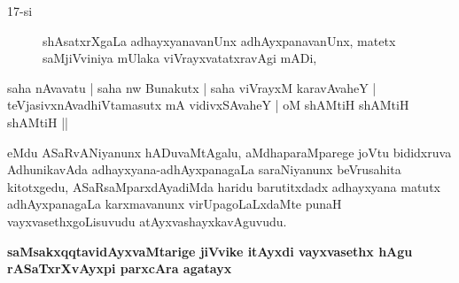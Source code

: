 \begin{description}
\item[17-si] shAsatxrXgaLa adhayxyanavanUnx adhAyxpanavanUnx, matetx saMjiVviniya mUlaka viVrayxvatatxravAgi mADi,
\end{description}
\begin{shloka}
saha nAvavatu | saha nw Bunakutx | saha viVrayxM karavAvaheY |\\\label{46}
teVjasivxnAvadhiVtamasutx mA vidivxSAvaheY | oM shAMtiH shAMtiH shAMtiH ||
\end{shloka}
\smallskip

\noindent
eMdu ASaRvANiyanunx hADuvaMtAgalu, aMdhaparaMparege joVtu bididxruva AdhunikavAda adhayxyana-adhAyxpanagaLa saraNiyanunx beVrusahita kitotxgedu, ASaRsaMparxdAyadiMda haridu barutitxdadx adhayxyana matutx adhAyxpanagaLa karxmavanunx virUpagoLaLxdaMte punaH vayxvasethxgoLisuvudu atAyxvashayxkavAguvudu.

{\bigskip
\noindent
{\large\bf saMsakxqqtavidAyxvaMtarige jiVvike itAyxdi vayxvasethx hAgu rASaTxrXvAyxpi parxcAra agatayx}}\label{page46}

